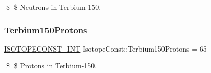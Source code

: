 \$ \$ Neutrons in Terbium-\/150. \mbox{\label{group___isotope_const-_terbium-_tb150_ga4f5814b2ae0ff038e03d1c28c07cb9aa}} 
\subsubsection{\texorpdfstring{Terbium150\+Protons}{Terbium150Protons}}
{\footnotesize\ttfamily \mbox{\hyperlink{group___isotope_const-_macros_ga5f18360b3e99483a35c32d789e62621c}{I\+S\+O\+T\+O\+P\+E\+C\+O\+N\+S\+T\+\_\+\+I\+NT}} Isotope\+Const\+::\+Terbium150\+Protons = 65}

\$ \$ Protons in Terbium-\/150. 